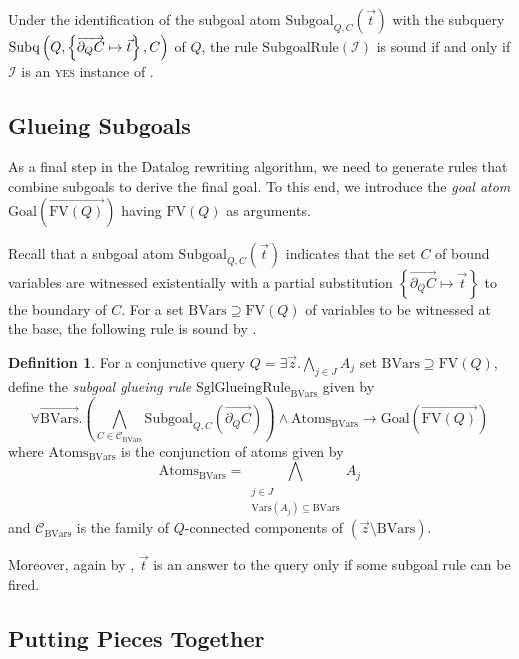 \documentclass[12pt]{report}
\theoremstyle{plain}
\theoremstyle{definition}
\newtheorem{definition}[theorem]{Definition}
\def\FV{{\mathrm{FV}}}
\def\Vars{{\mathrm{Vars}}}
\newcommand{\Subq}[3]{\ensuremath{\normalfont{\textrm{Subq}} \left( #1, #2, #3 \right)}}
\begin{document}
Under the identification of the subgoal atom $\mathrm{Subgoal}_{Q, C}(\vec{t})$ with the subquery $\Subq{Q}{\left\{ \overrightarrow{\partial_Q C} \mapsto \vec{t} \right\}}{C}$ of $Q$, the rule $\mathrm{SubgoalRule}(\mathcal{I})$ is sound if and only if $\mathcal{I}$ is an \textsc{yes} instance of .

\subsection{Glueing Subgoals}
\label{glueing-subgoals}

As a final step in the Datalog rewriting algorithm, we need to generate rules that combine subgoals to derive the final goal. To this end, we introduce the \emph{goal atom} $\mathrm{Goal}\left( \overrightarrow{\FV(Q)} \right)$ having $\FV(Q)$ as arguments.

Recall that a subgoal atom $\mathrm{Subgoal}_{Q, C}(\vec{t})$ indicates that the set $C$ of bound variables are witnessed existentially with a partial substitution $\left\{ \overrightarrow{\partial_Q C} \mapsto \vec{t} \right\}$ to the boundary of $C$. For a set $\mathrm{BVars} \supseteq \FV(Q)$ of variables to be witnessed at the base, the following rule is sound by .

\begin{definition}
\label{subgoal-glueing-rule}
  For a conjunctive query $Q = \exists \vec{z}. \bigwedge_{j \in J} A_j$ set $\mathrm{BVars} \supseteq \FV(Q)$, define the \emph{subgoal glueing rule} $\mathrm{SglGlueingRule}_\mathrm{BVars}$ given by
  $$
    \forall \overrightarrow{\mathrm{BVars}}. \left(
      \bigwedge_{C \in \mathcal{C}_\mathrm{BVars}} \mathrm{Subgoal}_{Q, C}\left(\overrightarrow{\partial_Q C}\right)
    \right) \wedge \mathrm{Atoms}_\mathrm{BVars}
    \rightarrow \mathrm{Goal}\left( \overrightarrow{\FV(Q)} \right)
  $$
  where $\mathrm{Atoms}_\mathrm{BVars}$ is the conjunction of atoms given by $$
    \mathrm{Atoms}_\mathrm{BVars} = \bigwedge_{\substack{j \in J \\ \Vars(A_j) \subseteq \mathrm{BVars}}} A_j
  $$ and $\mathcal{C}_\mathrm{BVars}$ is the family of $Q$-connected components of $(\vec{z} \setminus \mathrm{BVars})$.
\end{definition}

Moreover, again by , $\vec{t}$ is an answer to the query only if some subgoal rule can be fired.

\subsection{Putting Pieces Together}
\end{document}
